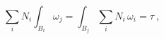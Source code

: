\begin{equation}
\sum_i N_i \int_{B_i} \omega_j =\int_{B_j} \sum_i N_i \,\omega_i=\tau \ ,
\label{mimim}
\end{equation}

